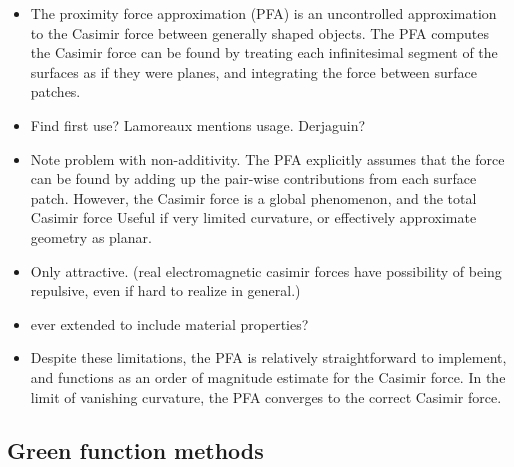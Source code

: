 \begin{itemize}
\item The proximity force approximation (PFA) is an uncontrolled approximation to
the Casimir force between generally shaped objects.  
The PFA computes the Casimir force can be found by treating each infinitesimal segment
of the surfaces as if they were planes, and integrating the force between surface patches.
\item Find first use?  Lamoreaux mentions usage.  Derjaguin?\cite{Derjaguin1956}
\item Note problem with non-additivity. The PFA explicitly assumes that the force
can be found by adding up the pair-wise contributions from each surface patch.  
However, the Casimir force is a global phenomenon, and the total Casimir force
Useful if very limited curvature, or effectively approximate geometry as planar.  
\item Only attractive.  (real electromagnetic casimir forces have possibility of 
being repulsive, even if hard to realize in general.)
\item ever extended to include material properties?
\item Despite these limitations, the PFA is relatively straightforward to implement,
and functions as an order of magnitude estimate for the Casimir force.  In the limit
of vanishing curvature, the PFA converges to the correct Casimir force.  
\end{itemize}

\subsection{Green function methods}

